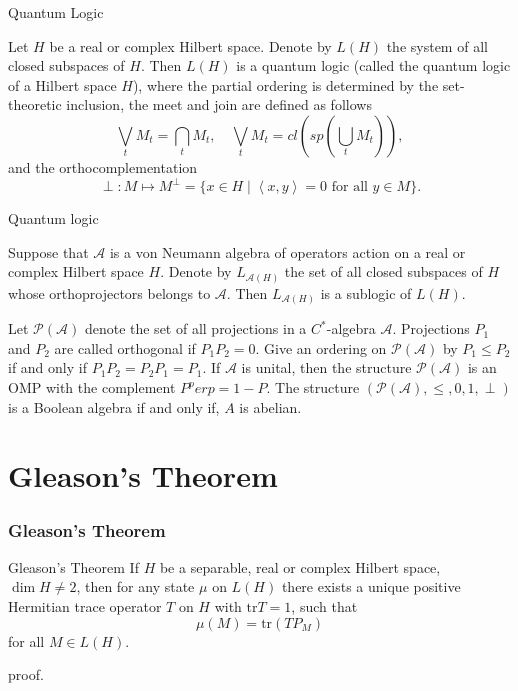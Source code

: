 \documentclass{beamer}
\begin{document}
\begin{frame}{Quantum Logic}
    \begin{example}
        Let \(H\) be a real or complex Hilbert space. Denote by \(L(H)\) the system of all closed subspaces of \(H\). Then \(L(H)\) is a quantum logic (called the quantum logic of a Hilbert space \(H\)), where the partial ordering is determined by the set-theoretic inclusion, the meet and join are defined as follows
        \[\bigvee_t M_t = \bigcap_t M_t, \quad \bigvee_t M_t = cl(sp(\bigcup_t M_t)),\]
        and the orthocomplementation \[\perp: M \mapsto M^\perp = \{x \in H \mid \left \langle x,y \right \rangle =0 \mbox{ for all } y \in M\}.\]
    \end{example}
\end{frame}

\begin{frame}{Quantum logic}
    \begin{example}
        Suppose that \(\mathcal{A}\) is a von Neumann algebra of operators action on a real or complex Hilbert space \(H\). Denote by \(L_{\mathcal{A}(H)}\) the set of all closed subspaces of \(H\) whose orthoprojectors belongs to \(\mathcal{A}\). Then \(L_{\mathcal{A}(H)}\) is a sublogic of \(L(H)\).
    \end{example}\pause
    \begin{example}
        Let \(\mathcal{P}(\mathcal{A})\) denote the set of all projections in a \(C^\ast\)-algebra \(\mathcal{A}\). Projections \(P_1\) and \(P_2\) are called orthogonal if \(P_1P_2 =0\). Give an ordering on \(\mathcal{P}(\mathcal{A})\) by \(P_1 \le P_2\) if and only if \(P_1P_2=P_2P_1=P_1\). If \(\mathcal{A}\) is unital, then the structure \(\mathcal{P}(\mathcal{A})\) is an OMP with the complement \(P^perp=1-P\). The structure \((\mathcal{P}(\mathcal{A}),\le,0,1,\perp)\) is a Boolean algebra if and only if, \(A\) is abelian.
    \end{example}
\end{frame}

\section{Gleason's Theorem}
\begin{frame}
    \frametitle{Gleason's Theorem}
\begin{block}{Gleason's Theorem}
    If \(H\) be a separable, real or complex Hilbert space, \(\dim H \neq 2\), then for any state \(\mu\) on \(L(H)\) there exists a unique positive Hermitian trace operator \(T\) on \(H\) with \(\mathrm{tr} T =1\), such that
    \[\mu(M) = \mathrm{tr}(TP_M)\]
    for all \(M \in L(H)\).
\end{block}
proof. \cite[p.131-149]{MR1256736}
\end{frame}
\end{document}
